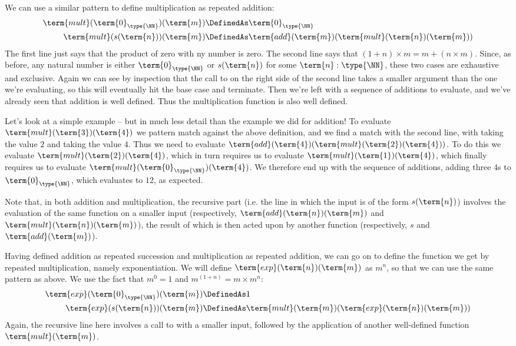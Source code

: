 We can use a similar pattern to define multiplication as repeated addition:
\begin{align*}
\term{mult}(\term{0}_{\type{\NN}})(\term{m}) &\DefinedAs \term{0}_{\type{\NN}}
\\
\term{mult}(s(\term{n}))(\term{m}) &\DefinedAs
\term{add}(\term{m})(\term{mult}(\term{n})(\term{m}))
\end{align*}
The first line just says that the product of zero with ny number is zero.  The second line says that $(1+n) \times m = m + (n \times m)$.  Since, as before, any natural number is either $\term{0}_{\type{\NN}}$ or $s(\term{n})$ for some $\term{n}:\type{\NN}$, these two cases are exhaustive and exclusive.  Again we can see by inspection that the call to  on the right side of the second line takes a smaller argument than the one we're evaluating, so this will eventually hit the base case and terminate.  Then we're left with a sequence of additions to evaluate, and we've already seen that addition is well defined.  Thus the multiplication function is also well defined.

Let's look at a simple example -- but in much less detail than the example we did for addition!  To evaluate 
$\term{mult}(\term{3})(\term{4})$
we pattern match against the above definition, and we find a match with the second line, with  taking the value $2$ and  taking the value $4$.  Thus we need to evaluate
$\term{add}(\term{4})(\term{mult}(\term{2})(\term{4}))$.  To do this we evaluate 
$\term{mult}(\term{2})(\term{4})$, which in turn requires us to evaluate
$\term{mult}(\term{1})(\term{4})$, which finally requires us to evaluate
$\term{mult}(\term{0}_{\type{\NN}})(\term{4})$.  We therefore end up with the sequence of additions, adding three $4$s to $\term{0}_{\type{\NN}}$, which evaluates to $12$, as expected.

Note that, in both addition and multiplication, the recursive part (i.e. the line in which the input is of the form $s(\term{n})$)
involves the evaluation of the same function on a smaller input (respectively, 
$\term{add}(\term{n})(\term{m})$
and 
$\term{mult}(\term{n})(\term{m})$), 
the result of which is then acted upon by another function
(respectively,
$s$ and 
$\term{add}(\term{m})$).

Having defined addition as repeated succession and multiplication as repeated addition, we can go on to define the function we get by repeated multiplication, namely exponentiation.  We will define 
$\term{exp}(\term{n})(\term{m})$ as $m^n$, so that we can use the same pattern as above.  We use the fact that $m^0 = 1$ and $m^{(1+n)} = m \times m^n$:
\begin{align*}
\term{exp}(\term{0}_{\type{\NN}})(\term{m}) &\DefinedAs 1
\\
\term{exp}(s(\term{n}))(\term{m}) &\DefinedAs
\term{mult}(\term{m})(\term{exp}(\term{n})(\term{m}))
\end{align*}
Again, the recursive line here involves a call to  with a smaller input, followed by the application of another well-defined function $\term{mult}(\term{m})$.


